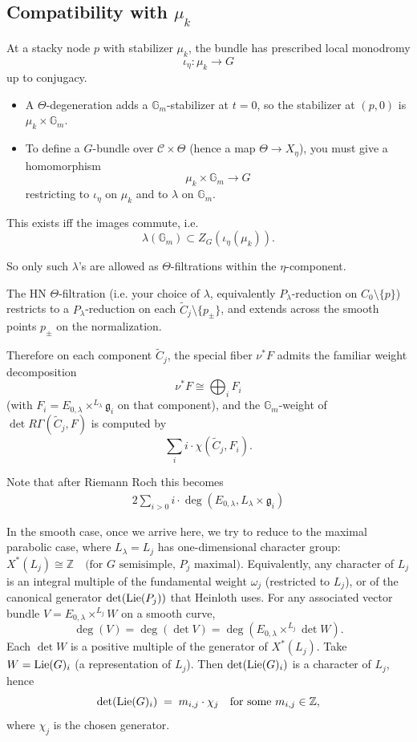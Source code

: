 \documentclass[12pt]{article}
\begin{document}
\subsection{Compatibility with $\mu_k$}
At a stacky node $p$ with stabilizer $\mu_k$, the bundle has prescribed local monodromy
\[
\iota_\eta:\mu_k\to G
\]
up to conjugacy.

\begin{itemize}
    \item A $\Theta$-degeneration adds a $\mathbb{G}_m$-stabilizer at $t=0$, so the stabilizer at $(p,0)$ is $\mu_k\times \mathbb{G}_m$.
    \item To define a $G$-bundle over $\mathcal{C}\times \Theta$ (hence a map $\Theta\to X_\eta$), you must give a homomorphism
    \[
    \mu_k\times \mathbb{G}_m \to G
    \]
    restricting to $\iota_\eta$ on $\mu_k$ and to $\lambda$ on $\mathbb{G}_m$.
\end{itemize}

This exists iff the images commute, i.e.
\[
\boxed{\lambda(\mathbb{G}_m)\subset Z_G(\iota_\eta(\mu_k))}.
\]

So only such $\lambda$'s are allowed as $\Theta$-filtrations within the $\eta$-component.

The HN $\Theta$-filtration (i.e. your choice of $\lambda$, equivalently $P_\lambda$-reduction on $C_0\setminus\{p\}$) restricts to a $P_\lambda$-reduction on each $\widetilde C_j\setminus\{p_\pm\}$, and extends across the smooth points $p_\pm$ on the normalization.

Therefore on each component $\widetilde C_j$, the special fiber $\nu^*F$ admits the familiar weight decomposition
$$\nu^*F \cong \bigoplus_i F_i$$
(with $F_i = E_{0,\lambda}\times^{L_\lambda}\mathfrak{g}_i$ on that component), and the $\mathbb{G}_m$-weight of $\det R\Gamma(\widetilde C_j,F)$ is computed by
$$\sum_i i\cdot \chi(\widetilde C_j,F_i).$$

Note that after Riemann Roch this becomes \begin{align*}
    2\sum_{i>0} i\cdot \deg(E_{0,\lambda},L_\lambda \times \mathfrak{g}_i)
\end{align*}

In the smooth case, once we arrive here, we try to reduce to the maximal parabolic case, where $L_\lambda=L_j$ has one-dimensional character group:
$X^*(L_j) \cong \mathbb{Z} \quad \text{(for } G \text{ semisimple, } P_j \text{ maximal).}$
Equivalently, any character of $L_j$ is an integral multiple of the fundamental weight $\omega_j$ (restricted to $L_j$), or of the canonical generator $\det(\operatorname{Lie}(P_j))$ that Heinloth uses. For any associated vector bundle $V = E_{0,\lambda} \times^{L_j} W$ on a smooth curve,
\[
\deg(V) = \deg(\det V) = \deg(E_{0,\lambda} \times^{L_j} \det W).
\]
Each $\det W$ is a positive multiple of the generator of $X^*(L_j)$.
Take $W = \operatorname{Lie}(G)_i$ (a representation of $L_j$). Then $\det(\operatorname{Lie}(G)_i)$ is a character of $L_j$, hence
\[
\det(\operatorname{Lie}(G)_i) \;=\; m_{i,j} \cdot \chi_j
\quad \text{for some } m_{i,j} \in \mathbb{Z},
\]
where $\chi_j$ is the chosen generator. 
\end{document}
